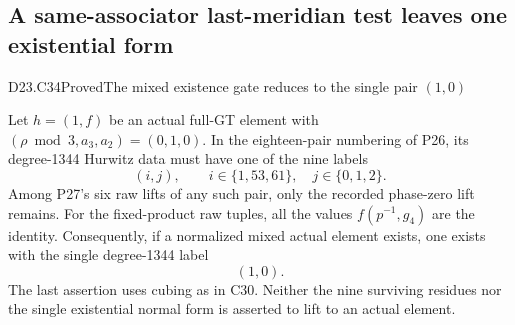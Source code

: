 \subsection{A same-associator last-meridian test leaves one existential form}

\begin{statement}{D23.C34}{Proved}{The mixed existence gate reduces to the single pair $(1,0)$}
\end{statement}
Let $h=(1,f)$ be an actual full-GT element with
$(\rho\bmod3,a_3,a_2)=(0,1,0)$.
In the eighteen-pair numbering of P26, its degree-1344
Hurwitz data must have one of the nine labels
\[
                   (i,j),\qquad i\in\{1,53,61\},
                   \quad j\in\{0,1,2\}.                  \tag{D23.C34.1}
\]
Among P27's six raw lifts of any such pair, only the
recorded phase-zero lift remains.  For the fixed-product
raw tuples, all the values $f(p^{-1},g_4)$ are the identity.
Consequently, if a normalized mixed actual element exists,
one exists with the single degree-1344 label
\[
                                  (1,0).                 \tag{D23.C34.2}
\]
The last assertion uses cubing as in C30.  Neither the
nine surviving residues nor the single existential
normal form is asserted to lift to an actual element.

